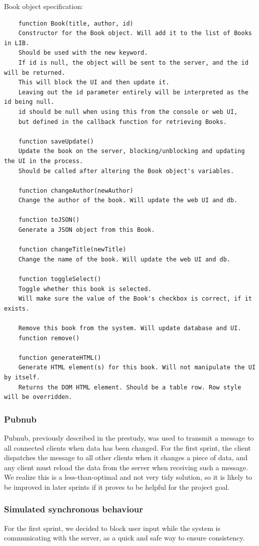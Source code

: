 Book object specification:
\begin{verbatim}
    function Book(title, author, id)
    Constructor for the Book object. Will add it to the list of Books in LIB. 
    Should be used with the new keyword.
    If id is null, the object will be sent to the server, and the id will be returned. 
    This will block the UI and then update it.
    Leaving out the id parameter entirely will be interpreted as the id being null.
    id should be null when using this from the console or web UI, 
    but defined in the callback function for retrieving Books.
    
    function saveUpdate()
    Update the book on the server, blocking/unblocking and updating the UI in the process.
    Should be called after altering the Book object's variables.
    
    function changeAuthor(newAuthor)
    Change the author of the book. Will update the web UI and db.
    
    function toJSON()
    Generate a JSON object from this Book.

    function changeTitle(newTitle)
    Change the name of the book. Will update the web UI and db.

    function toggleSelect()
    Toggle whether this book is selected. 
    Will make sure the value of the Book's checkbox is correct, if it exists.
    
    Remove this book from the system. Will update database and UI.
    function remove()

    function generateHTML()
    Generate HTML element(s) for this book. Will not manipulate the UI by itself.
    Returns the DOM HTML element. Should be a table row. Row style will be overridden.
\end{verbatim}


\subsubsection{Pubnub}
Pubnub, previously described in the prestudy, was used to transmit a message to all connected clients when data has been changed. For the first sprint, the client dispatches the message to all other clients when it changes a piece of data, and any client must reload the data from the server when receiving such a message. We realize this is a less-than-optimal and not very tidy solution, so it is likely to be improved in later sprints if it proves to be helpful for the project goal.

\subsubsection{Simulated synchronous behaviour}
For the first sprint, we decided to block user input while the system is communicating with the server, as a quick and safe way to ensure consistency.

